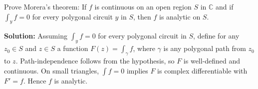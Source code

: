 \begin{problembox}
Prove Morera's theorem: If \( f \) is continuous on an open region \( S \) in \( \mathbb{C} \) and if \( \int_y f = 0 \) for every polygonal circuit \( y \) in \( S \), then \( f \) is analytic on \( S \).
\end{problembox}

\noindent\textbf{Solution:}
Assuming $\int_y f=0$ for every polygonal circuit in $S$, define for any $z_0\in S$ and $z\in S$ a function $F(z)=\int_{\gamma} f$, where $\gamma$ is any polygonal path from $z_0$ to $z$. Path-independence follows from the hypothesis, so $F$ is well-defined and continuous. On small triangles, $\int f=0$ implies $F$ is complex differentiable with $F'=f$. Hence $f$ is analytic.
